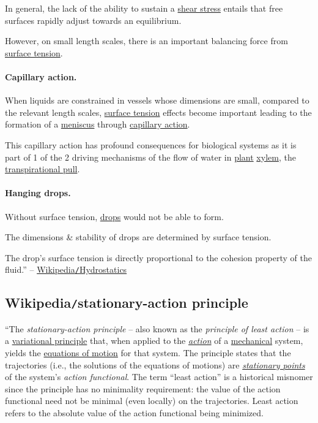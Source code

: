 \documentclass{article}
\begin{document}
In general, the lack of the ability to sustain a \href{https://en.wikipedia.org/wiki/Shear_stress}{shear stress} entails that free surfaces rapidly adjust towards an equilibrium.

However, on small length scales, there is an important balancing force from \href{https://en.wikipedia.org/wiki/Surface_tension}{surface tension}.

\paragraph{Capillary action.} When liquids are constrained in vessels whose dimensions are small, compared to the relevant length scales, \href{https://en.wikipedia.org/wiki/Surface_tension}{surface tension} effects become important leading to the formation of a \href{https://en.wikipedia.org/wiki/Meniscus_(liquid)}{meniscus} through \href{https://en.wikipedia.org/wiki/Capillary_action}{capillary action}.

This capillary action has profound consequences for biological systems as it is part of 1 of the 2 driving mechanisms of the flow of water in \href{https://en.wikipedia.org/wiki/Plant}{plant} \href{https://en.wikipedia.org/wiki/Xylem}{xylem}, the \href{https://en.wikipedia.org/wiki/Transpirational_pull}{transpirational pull}.

\paragraph{Hanging drops.} Without surface tension, \href{https://en.wikipedia.org/wiki/Drop_(liquid)}{drops} would not be able to form.

The dimensions \& stability of drops are determined by surface tension.

The drop's surface tension is directly proportional to the cohesion property of the fluid.'' -- \href{https://en.wikipedia.org/wiki/Hydrostatics}{Wikipedia{\tt/}Hydrostatics}


\subsection{Wikipedia{\tt/}stationary-action principle}
``The \textit{stationary-action principle} -- also known as the \textit{principle of least action} -- is a \href{https://en.wikipedia.org/wiki/Variational_principle}{variational principle} that, when applied to the \href{https://en.wikipedia.org/wiki/Action_(physics)}{\textit{action}} of a \href{https://en.wikipedia.org/wiki/Mechanics}{mechanical} system, yields the \href{https://en.wikipedia.org/wiki/Equations_of_motion}{equations of motion} for that system. The principle states that the trajectories (i.e., the solutions of the equations of motions) are \href{https://en.wikipedia.org/wiki/Stationary_point}{\textit{stationary points}} of the system's \textit{action functional}. The term ``least action'' is a historical misnomer since the principle has no minimality requirement: the value of the action functional need not be minimal (even locally) on the trajectories. Least action refers to the absolute value of the action functional being minimized.
\end{document}
